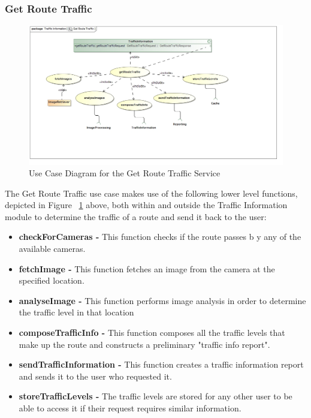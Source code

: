 \documentclass[a4paper,12pt]{article}
\begin{document}
\subsubsection{Get Route Traffic}
\begin{figure}[here]
\includegraphics[width=\textwidth]{images/Get_Route_Traffic.jpg}
\caption{Use Case Diagram for the Get Route Traffic Service}
\label{fig:uc_gettraffic}
\end{figure}

The Get Route Traffic use case makes use of the following lower level functions, depicted in Figure ~\ref{fig:uc_gettraffic} above, both within and outside the Traffic Information module to determine the traffic of a route and send it back to the user:
\begin{itemize}
\item \textbf{checkForCameras -} This function checks if the route passes b y any of the available cameras.
\item \textbf{fetchImage -} This function fetches an image from the camera at the specified location.
\item \textbf{analyseImage -} This function performs image analysis in order to determine the traffic level in that location
\item \textbf{composeTrafficInfo -} This function composes all the traffic levels that make up the route and constructs a preliminary "traffic info report".
\item \textbf{sendTrafficInformation -} This function creates a traffic information report and sends it to the user who requested it.
\item \textbf{storeTrafficLevels -} The traffic levels are stored for any other user to be able to access it if their request requires similar information.
\end{itemize}
\end{document}
